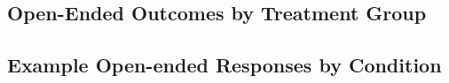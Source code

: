 \documentclass[]{article}
\begin{document}
\subsection{Open-Ended Outcomes by Treatment Group}








\subsection{Example Open-ended Responses by Condition}
\end{document}
